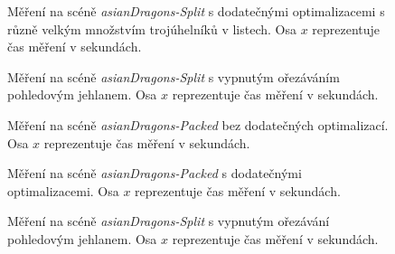 \documentclass[report,11pt]{elsarticle}
\begin{document}
\begin{figure}
    \begin{center}
        
    \end{center}
    \caption{Měření na scéně \textit{asianDragons-Split} s dodatečnými optimalizacemi
             s různě velkým množstvím trojúhelníků v listech. Osa $x$ reprezentuje
             čas měření v sekundách.}
    \label{measure:AllOptim:asianDragons-Split}
\end{figure}

\begin{figure}
    \begin{center}
        
    \end{center}
    \caption{Měření na scéně \textit{asianDragons-Split} s vypnutým ořezáváním pohledovým
             jehlanem. Osa $x$ reprezentuje čas měření v sekundách.}
    \label{measure:NoCull:asianDragons-Split}
\end{figure}


\begin{figure}
    \begin{center}
        
    \end{center}
    \caption{Měření na scéně \textit{asianDragons-Packed} bez dodatečných optimalizací.
             Osa $x$ reprezentuje čas měření v sekundách.}
    \label{measure:NoOptim:asianDragons-Packed}
\end{figure}

\begin{figure}
    \begin{center}
        
    \end{center}
    \caption{Měření na scéně \textit{asianDragons-Packed} s dodatečnými
             optimalizacemi. Osa $x$ reprezentuje čas měření v sekundách.}
    \label{measure:AllOptim:asianDragons-Packed}
\end{figure}

\begin{figure}
    \begin{center}
        
    \end{center}
    \caption{Měření na scéně \textit{asianDragons-Split} s vypnutým ořezávání pohledovým
             jehlanem. Osa $x$ reprezentuje čas měření v sekundách.}
    \label{measure:NoCull:asianDragons-Packed}
\end{figure}
\end{document}
